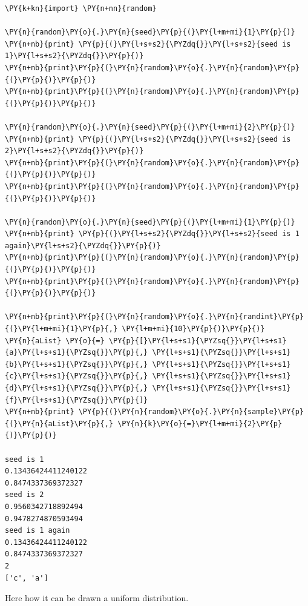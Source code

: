\begin{tcolorbox}[breakable, size=fbox, boxrule=1pt, pad at break*=1mm,colback=cellbackground, colframe=cellborder]
\begin{Verbatim}[commandchars=\\\{\}]
\PY{k+kn}{import} \PY{n+nn}{random} 

\PY{n}{random}\PY{o}{.}\PY{n}{seed}\PY{p}{(}\PY{l+m+mi}{1}\PY{p}{)}
\PY{n+nb}{print} \PY{p}{(}\PY{l+s+s2}{\PYZdq{}}\PY{l+s+s2}{seed is 1}\PY{l+s+s2}{\PYZdq{}}\PY{p}{)}
\PY{n+nb}{print}\PY{p}{(}\PY{n}{random}\PY{o}{.}\PY{n}{random}\PY{p}{(}\PY{p}{)}\PY{p}{)}
\PY{n+nb}{print}\PY{p}{(}\PY{n}{random}\PY{o}{.}\PY{n}{random}\PY{p}{(}\PY{p}{)}\PY{p}{)}

\PY{n}{random}\PY{o}{.}\PY{n}{seed}\PY{p}{(}\PY{l+m+mi}{2}\PY{p}{)}
\PY{n+nb}{print} \PY{p}{(}\PY{l+s+s2}{\PYZdq{}}\PY{l+s+s2}{seed is 2}\PY{l+s+s2}{\PYZdq{}}\PY{p}{)}
\PY{n+nb}{print}\PY{p}{(}\PY{n}{random}\PY{o}{.}\PY{n}{random}\PY{p}{(}\PY{p}{)}\PY{p}{)}
\PY{n+nb}{print}\PY{p}{(}\PY{n}{random}\PY{o}{.}\PY{n}{random}\PY{p}{(}\PY{p}{)}\PY{p}{)}

\PY{n}{random}\PY{o}{.}\PY{n}{seed}\PY{p}{(}\PY{l+m+mi}{1}\PY{p}{)}
\PY{n+nb}{print} \PY{p}{(}\PY{l+s+s2}{\PYZdq{}}\PY{l+s+s2}{seed is 1 again}\PY{l+s+s2}{\PYZdq{}}\PY{p}{)}
\PY{n+nb}{print}\PY{p}{(}\PY{n}{random}\PY{o}{.}\PY{n}{random}\PY{p}{(}\PY{p}{)}\PY{p}{)}
\PY{n+nb}{print}\PY{p}{(}\PY{n}{random}\PY{o}{.}\PY{n}{random}\PY{p}{(}\PY{p}{)}\PY{p}{)}

\PY{n+nb}{print}\PY{p}{(}\PY{n}{random}\PY{o}{.}\PY{n}{randint}\PY{p}{(}\PY{l+m+mi}{1}\PY{p}{,} \PY{l+m+mi}{10}\PY{p}{)}\PY{p}{)}
\PY{n}{aList} \PY{o}{=} \PY{p}{[}\PY{l+s+s1}{\PYZsq{}}\PY{l+s+s1}{a}\PY{l+s+s1}{\PYZsq{}}\PY{p}{,} \PY{l+s+s1}{\PYZsq{}}\PY{l+s+s1}{b}\PY{l+s+s1}{\PYZsq{}}\PY{p}{,} \PY{l+s+s1}{\PYZsq{}}\PY{l+s+s1}{c}\PY{l+s+s1}{\PYZsq{}}\PY{p}{,} \PY{l+s+s1}{\PYZsq{}}\PY{l+s+s1}{d}\PY{l+s+s1}{\PYZsq{}}\PY{p}{,} \PY{l+s+s1}{\PYZsq{}}\PY{l+s+s1}{f}\PY{l+s+s1}{\PYZsq{}}\PY{p}{]}
\PY{n+nb}{print} \PY{p}{(}\PY{n}{random}\PY{o}{.}\PY{n}{sample}\PY{p}{(}\PY{n}{aList}\PY{p}{,} \PY{n}{k}\PY{o}{=}\PY{l+m+mi}{2}\PY{p}{)}\PY{p}{)}

seed is 1
0.13436424411240122
0.8474337369372327
seed is 2
0.9560342718892494
0.9478274870593494
seed is 1 again
0.13436424411240122
0.8474337369372327
2
['c', 'a']
    \end{Verbatim}
\end{tcolorbox}

Here how it can be drawn a uniform distribution.

